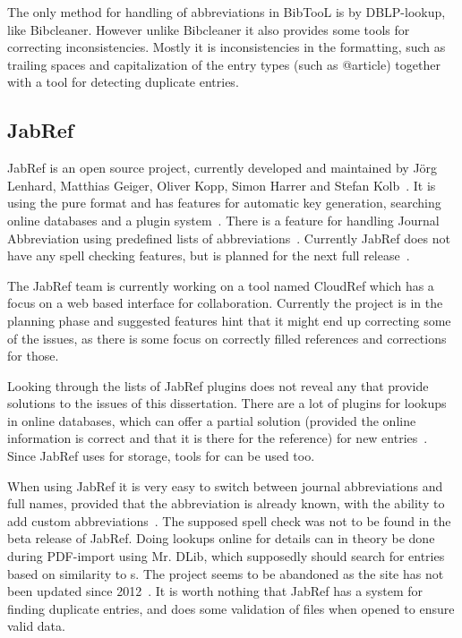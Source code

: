 The only method for handling of abbreviations in BibTooL is by
DBLP-lookup, like Bibcleaner.  However unlike Bibcleaner it also
provides some tools for correcting inconsistencies.  Mostly it is
inconsistencies in the formatting, such as trailing spaces and
capitalization of the entry types (such as @article) together with a
tool for detecting duplicate entries.

\subsection{JabRef}
JabRef is an open source project, currently developed and maintained
by Jörg Lenhard, Matthias Geiger, Oliver Kopp, Simon Harrer and Stefan
Kolb~\cite{jabref_developers}.  It is using the pure {\bibtex} format
and has features for automatic key generation, searching online
databases and a plugin system~\cite{jabref_features}.  There is a
feature for handling Journal Abbreviation using predefined lists of
abbreviations~\cite{jabref_abbreviations}.  Currently JabRef does not
have any spell checking features, but is planned for the next full
release~\cite{jabref_spellchecker}.

The JabRef team is currently working on a tool named CloudRef which
has a focus on a web based interface for collaboration.  Currently the
project is in the planning phase and suggested features hint that it
might end up correcting some of the issues, as there is some focus on
correctly filled {\bibtex} references and corrections for those.

Looking through the lists of JabRef plugins does not reveal any that
provide solutions to the issues of this dissertation.  There are a lot
of plugins for lookups in online databases, which can offer a partial
solution (provided the online information is correct and that it is
there for the reference) for new entries~\cite{jabref_resources}.
Since JabRef uses {\bibtex} for storage, tools for {\bibtex} can be
used too.

When using JabRef it is very easy to switch between journal
abbreviations and full names, provided that the abbreviation is
already known, with the ability to add custom
abbreviations~\cite{jabref_abbreviations}.  The supposed spell check
was not to be found in the beta release of JabRef.  Doing lookups
online for details can in theory be done during PDF-import using
Mr. DLib, which supposedly should search for entries based on
similarity to s.  The project seems to be abandoned as the
site has not been updated since
2012~\cite{jabref_mrdlib,jabref_mrdlib_notice}.  It is worth nothing
that JabRef has a system for finding duplicate entries, and does some
validation of {\bibtex} files when opened to ensure valid data.

